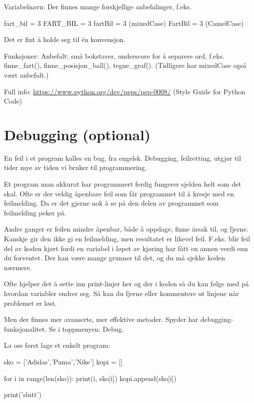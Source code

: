 {Variabelnavn: 
Der finnes mange forskjellige anbefalinger, f.eks.
\begin{usncodebox}
fart_bil = 3
FART_BIL = 3
fartBil = 3 (mixedCase)
FartBil = 3 (CamelCase)
\end{usncodebox}

Det er fint å holde seg til én konvensjon. 

Funksjoner:
Anbefalt: små bokstaver, underscore for å separere ord, f.eks. finne\_{}fart(), finne\_{}posisjon\_{}ball(), tegne\_{}graf(). (Tidligere har mixedCase også vært anbefalt.) 

Full info: \url{https://www.python.org/dev/peps/pep-0008/} (Style Guide for Python Code) 

\section{Debugging (optional)}

En feil i et program kalles en bug, fra engelsk. Debugging, feilretting, utgjør til tider mye av tiden vi bruker til programmering. 

Et program man akkurat har programmert ferdig fungerer sjelden helt som det skal. Ofte er der veldig åpenbare feil som får programmet til å kresje med en feilmelding. Da er det gjerne nok å se på den delen av programmet som feilmelding peker på. 

Andre ganger er feilen mindre åpenbar, både å oppdage, finne årsak til, og fjerne. Kanskje gir den ikke gi en feilmelding, men resultatet er likevel feil. F.eks. blir feil del av koden kjørt fordi en variabel i løpet av kjøring har fått en annen verdi enn du forventet. Der kan være mange grunner til det, og du må sjekke koden nærmere. 

Ofte hjelper det å sette inn print-linjer her og der i koden så du kan følge med på hvordan variabler endrer seg. Så kan du fjerne eller kommentere ut linjene når problemet er løst.

Men der finnes mer avanserte, mer effektive metoder. Spyder har debugging-funksjonalitet.
Se i toppmenyen: Debug.

La oss først lage et enkelt program:

\begin{usncodebox}
sko = ['Adidas','Puma','Nike']
kopi = []

for i in range(len(sko)): 
    print(i, sko[i])
    kopi.append(sko[i])

print('slutt')
\end{usncodebox}

}
